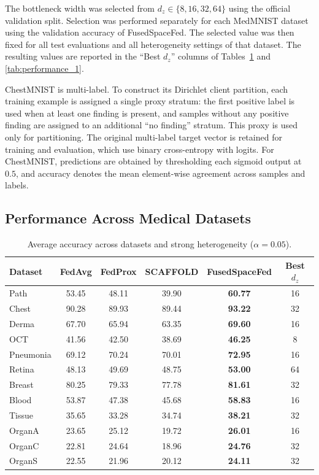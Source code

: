 \documentclass[twoside]{article}
\theoremstyle{thmstyleone}%
\theoremstyle{thmstyletwo}%
\theoremstyle{thmstylethree}%
\begin{document}
The bottleneck width was selected from
$d_z\in\{8,16,32,64\}$ using the official validation split. Selection was
performed separately for each MedMNIST dataset using the validation accuracy
of FusedSpaceFed. The selected value was then fixed for all test
evaluations and all heterogeneity settings of that dataset. The resulting values are reported in the
``Best $d_z$'' columns of Tables~\ref{tab:performance} and
\ref{tab:performance_1}.

ChestMNIST is multi-label. To construct its Dirichlet client partition, each
training example is assigned a single proxy stratum: the first positive label
is used when at least one finding is present, and samples without any positive
finding are assigned to an additional ``no finding'' stratum. This proxy is
used only for partitioning. The original multi-label target vector is retained
for training and evaluation, which use binary cross-entropy with logits.
For ChestMNIST, predictions are obtained by thresholding each sigmoid output at
$0.5$, and accuracy denotes the mean element-wise agreement across samples and
labels.

\subsection{Performance Across Medical Datasets}

\begin{table}[t]
\centering
\caption{Average accuracy across datasets and strong heterogeneity ($\alpha=0.05$).}
\label{tab:performance}
\begin{tabular}{lccccc}
\toprule
Dataset & FedAvg & FedProx & SCAFFOLD & \textbf{FusedSpaceFed} & Best $d_z$ \\
\midrule
Path & 53.45 & 48.11 & 39.90 & \textbf{60.77} & 16 \\
Chest & 90.28 & 89.93 & 89.44 & \textbf{93.22} & 32 \\
Derma & 67.70 & 65.94 & 63.35 & \textbf{69.60} & 16 \\
OCT & 41.56 & 42.50 & 38.69 & \textbf{46.25} & 8 \\
Pneumonia & 69.12 & 70.24 & 70.01 & \textbf{72.95} & 16 \\
Retina & 48.13 & 49.69 & 48.75 & \textbf{53.00} & 64 \\
Breast & 80.25 & 79.33 & 77.78 & \textbf{81.61} & 32 \\
Blood & 53.87 & 47.38 & 45.68 & \textbf{58.83} & 16 \\
Tissue & 35.65 & 33.28 & 34.74 & \textbf{38.21} & 32 \\
OrganA & 23.65 & 25.12 & 19.72 & \textbf{26.01} & 16 \\
OrganC & 22.81 & 24.64 & 18.96 & \textbf{24.76} & 32 \\
OrganS & 22.55 & 21.96 & 20.12 & \textbf{24.11} & 32 \\
\bottomrule
\end{tabular}
\end{table}
\end{document}
